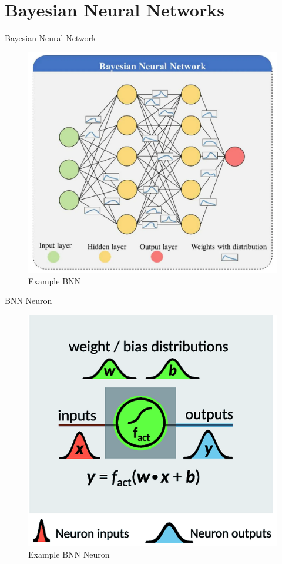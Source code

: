 \documentclass{beamer}
\begin{document}
\section{Bayesian Neural Networks}

\begin{frame}{Bayesian Neural Network}
	\begin{figure}
		\includegraphics[width=.55\textwidth]{../Images/example_bnn.png}
		\caption{Example BNN  \cite{FleszarBNN}}
	\end{figure}
\end{frame}

\begin{frame}{BNN Neuron}
	\begin{figure}
		\includegraphics[width=.55\textwidth]{../Images/BNN-neuron.png}
		\caption{Example BNN Neuron \cite{hase2019machine}}
	\end{figure}
\end{frame}
\end{document}
